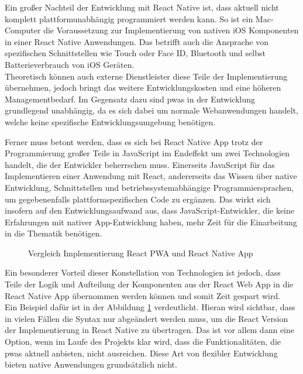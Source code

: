 Ein großer Nachteil der Entwicklung mit React Native ist, dass aktuell nicht komplett plattformunabhängig programmiert werden kann.
So ist ein Mac-Computer die Voraussetzung zur Implementierung von nativen iOS Komponenten in einer React Native Anwendungen.
Das betrifft auch die Ansprache von spezifischen Schnittstellen wie Touch oder Face ID, Bluetooth und selbst Batterieverbrauch von iOS Geräten.\\
Theoretisch können auch externe Dienstleister diese Teile der Implementierung übernehmen, jedoch bringt das weitere Entwicklungskosten und eine höheren Managementbedarf.
Im Gegensatz dazu sind \acp{pwa} in der Entwicklung grundlegend unabhängig, da es sich dabei um normale Webanwendungen handelt, welche keine spezifische Entwicklungsumgebung benötigen.

Ferner muss betont werden, dass es sich bei React Native App trotz der Programmierung großer Teile in JavaScript im Endeffekt um zwei Technologien handelt, die der Entwickler beherrschen muss.
Einerseits JavaScript für das Implementieren einer Anwendung mit React, andererseits das Wissen über native Entwicklung, Schnittstellen und betriebssystemabhängige Programmiersprachen, um gegebenenfalls plattformspezifischen Code zu ergänzen.
Das wirkt sich insofern auf den Entwicklungsaufwand aus, dass JavaScript-Entwickler, die keine Erfahrungen mit nativer App-Entwicklung haben, mehr Zeit für die Einarbeitung in die Thematik benötigen.

\begin{figure}
\caption{Vergleich Implementierung React PWA und React Native App}
\label{fig:textinputComparison}
\end{figure}

Ein besonderer Vorteil dieser Konstellation von Technologien ist jedoch, dass Teile der Logik und Aufteilung der Komponenten aus der React Web App in die React Native App übernommen werden können und somit Zeit gespart wird.\\
Ein Beispiel dafür ist in der Abbildung \ref{fig:textinputComparison} verdeutlicht.
Hieran wird sichtbar, dass in vielen Fällen die Syntax nur abgeändert werden muss, um die React Version der Implementierung in React Native zu übertragen.
Das ist vor allem dann eine Option, wenn im Laufe des Projekts klar wird, dass die Funktionalitäten, die \acp{pwa} aktuell anbieten, nicht ausreichen.
Diese Art von flexibler Entwicklung bieten native Anwendungen grundsätzlich nicht.

